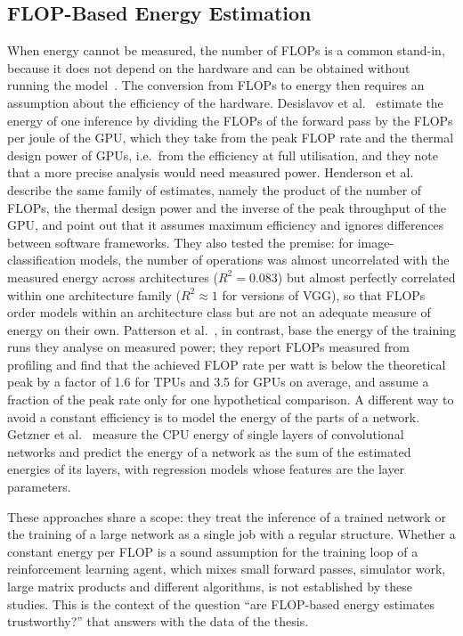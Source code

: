 \subsection{FLOP-Based Energy Estimation}\label{sec:related-flop}

When energy cannot be measured, the number of FLOPs is a common stand-in, because it does not depend on the hardware and can be obtained without running the model~\cite{schwartz2020green}.
The conversion from FLOPs to energy then requires an assumption about the efficiency of the hardware.
Desislavov et al.~\cite{desislavov2023trends} estimate the energy of one inference by dividing the FLOPs of the forward pass by the FLOPs per joule of the GPU, which they take from the peak FLOP rate and the thermal design power of GPUs, i.e.\ from the efficiency at full utilisation, and they note that a more precise analysis would need measured power.
Henderson et al.~\cite{henderson2020systematic} describe the same family of estimates, namely the product of the number of FLOPs, the thermal design power and the inverse of the peak throughput of the GPU, and point out that it assumes maximum efficiency and ignores differences between software frameworks.
They also tested the premise: for image-classification models, the number of operations was almost uncorrelated with the measured energy across architectures ($R^2 = \num{0.083}$) but almost perfectly correlated within one architecture family ($R^2 \approx \num{1}$ for versions of VGG), so that FLOPs order models within an architecture class but are not an adequate measure of energy on their own.
Patterson et al.~\cite{patterson2021carbon}, in contrast, base the energy of the training runs they analyse on measured power; they report FLOPs measured from profiling and find that the achieved FLOP rate per watt is below the theoretical peak by a factor of \num{1.6} for TPUs and \num{3.5} for GPUs on average, and assume a fraction of the peak rate only for one hypothetical comparison.
A different way to avoid a constant efficiency is to model the energy of the parts of a network.
Getzner et al.~\cite{getzner2023accuracy} measure the CPU energy of single layers of convolutional networks and predict the energy of a network as the sum of the estimated energies of its layers, with regression models whose features are the layer parameters.

These approaches share a scope: they treat the inference of a trained network or the training of a large network as a single job with a regular structure.
Whether a constant energy per FLOP is a sound assumption for the training loop of a reinforcement learning agent, which mixes small forward passes, simulator work, large matrix products and different algorithms, is not established by these studies.
This is the context of the question \enquote{are FLOP-based energy estimates trustworthy?} that  answers with the data of the thesis.

